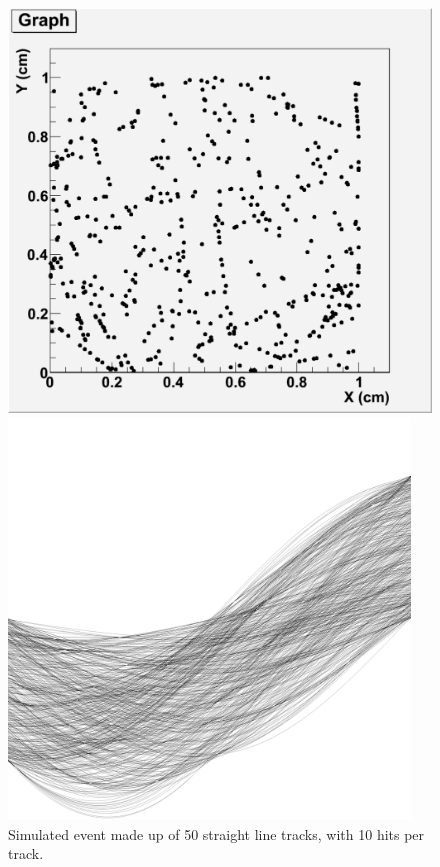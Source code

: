 \documentclass{JINST}
\begin{document}
\begin{figure}[!Hhtb]
\begin{minipage}[t]{4.9cm}
\begin{center}
	\includegraphics[width=1.\textwidth]{figs/50events_hits.pdf}
	\caption{Simulated event made up of 50 straight line tracks, with 10 hits per track. \label{fig:hits}}
	\end{center}
\end{minipage}
\begin{minipage}[t]{4.9cm}
\begin{center}
	\includegraphics[width=0.95\textwidth]{figs/50events_accumulator.pdf}

\end{center}
\end{minipage}
\end{figure}
\end{document}
